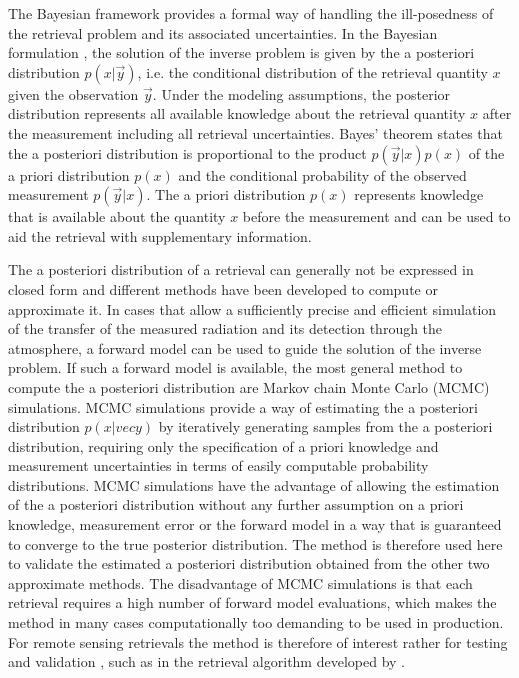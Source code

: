 \documentclass[journal abbreviation, manuscript]{copernicus}
\begin{document}
The Bayesian framework provides a formal way of handling the ill-posedness of
the retrieval problem and its associated uncertainties. In the Bayesian
formulation \citep{rodgers}, the solution of the inverse problem is given by the
a posteriori distribution $p(x | \vec{y})$, i.e. the conditional distribution of
the retrieval quantity $x$ given the observation $\vec{y}$. Under the modeling
assumptions, the posterior distribution represents all available knowledge about
the retrieval quantity $x$ after the measurement including all retrieval
uncertainties. Bayes' theorem states that the a posteriori distribution is
proportional to the product $p(\vec{y} | x)p(x)$ of the a priori distribution
$p(x)$ and the conditional probability of the observed measurement $p(\vec{y} |
x)$. The a priori distribution $p(x)$ represents knowledge that is available
about the quantity $x$ before the measurement and can be used to aid the
retrieval with supplementary information.

The a posteriori distribution of a retrieval can generally not be expressed in
closed form and different methods have been developed to compute or approximate
it. In cases that allow a sufficiently precise and efficient simulation of the
transfer of the measured radiation and its detection through the atmosphere, a
forward model can be used to guide the solution of the inverse problem. If such
a forward model is available, the most general method to compute the a
posteriori distribution are Markov chain Monte Carlo (MCMC) simulations. MCMC
simulations provide a way of estimating the a posteriori distribution $p(x |
vec{y})$ by iteratively generating samples from the a posteriori distribution,
requiring only the specification of a priori knowledge and measurement
uncertainties in terms of easily computable probability distributions. MCMC
simulations have the advantage of allowing the estimation of the a posteriori
distribution without any further assumption on a priori knowledge, measurement
error or the forward model in a way that is guaranteed to converge to the true
posterior distribution. The method is therefore used here to validate the
estimated a posteriori distribution obtained from the other two approximate
methods. The disadvantage of MCMC simulations is that each retrieval requires a
high number of forward model evaluations, which makes the method in many cases
computationally too demanding to be used in production. For remote sensing
retrievals the method is therefore of interest rather for testing and validation
 \citep{tamminen}, such as in the retrieval algorithm developed by \cite{evans_2}.
\end{document}
